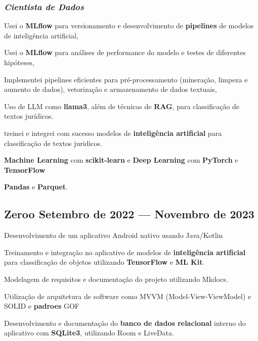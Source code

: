\documentclass[a4paper,12pt]{article}
\begin{document}
\subsubsection*{\normalsize \textit{Cientista de Dados}}
\vspace{-1em}
\vspace{-0.5em}
\begin{zitemize}
    \item Usei o \textbf{MLflow} para versionamento e desenvolvimento de \textbf{pipelines} de modelos de inteligência artificial,
    \item Usei o \textbf{MLflow} para análises de performance do modelo e testes de diferentes hipóteses,
    \item Implementei pipelines eficientes para pré-processamento (mineração, limpeza e aumento de dados), vetorização e armazenamento de dados textuais,
    \item Uso de LLM como \textbf{llama3}, além de técnicas de \textbf{RAG}, para classificação de textos jurídicos.
    \item treinei e integrei com sucesso modelos de \textbf{inteligência artificial} para classificação de textos juridicos.
    \item \textbf{Machine Learning} com \textbf{ scikit-learn} e \textbf{Deep Learning} com \textbf{PyTorch} e  \textbf{TensorFlow}
    \item \textbf{Pandas} e \textbf{Parquet}.
\end{zitemize}

\vspace{1.5em}
\vspace*{7pt}
\vspace{1.5em}

\subsection*{\large Zeroo \hfill Setembro de 2022 --- Novembro de 2023}

\vspace{-0.5em}
\begin{zitemize}
    \item Desenvolvimento de um aplicativo Android nativo usando Java/Kotlin
    \item Treinamento e integração no aplicativo de modelos de \textbf{inteligência artificial} para classificação de objetos utilizando \textbf{TensorFlow} e \textbf{ML Kit}.  
    \item Modelagem de requisitos e documentação do projeto utilizando Mkdocs.
    \item Utilização de arquitetura de software como MVVM (Model-View-ViewModel) e SOLID e \textbf{padroes} GOF
    \item Desenvolvimento e documentação do \textbf{banco de dados relacional} interno do aplicativo com \textbf{SQLite3}, utilizando Room e LiveData.
\end{zitemize}
\end{document}
